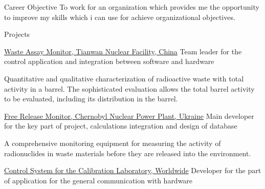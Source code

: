 \documentclass{cv} %
\begin{document}
\begin{rSection}{Career Objective}
 To work for an organization which provides me the opportunity to improve my skills which i can use for achieve organizational objectives.
\end{rSection}
\begin{rSection}{Projects}
\begin{rSubsection}
{\href{https://www.vfnuclear.com/en/products/waste-assay-monitor}{Waste Assay Monitor, Tianwan Nuclear Facility, China}}{}
{Team leader for the control application and integration between software and hardware}{}

Quantitative and qualitative characterization of radioactive waste with total activity in a barrel. The sophisticated evaluation allows the total barrel activity to be evaluated, including its distribution in the barrel.
\end{rSubsection}

\begin{rSubsection}
{\href{https://www.vfnuclear.com/en/free-release-monitor-frm-03-delivery-for-chernobyl-npp}{Free Release Monitor, Chernobyl Nuclear Power Plant, Ukraine}}{}
{Main developer for the key part of project, calculations integration and design of database}{}

A comprehensive monitoring equipment for measuring the activity of radionuclides in waste materials before they are released into the environment.
\end{rSubsection}



\begin{rSubsection}
{\href{https://www.vf.cz/en/products/dars-control-system-for-the-calibration-laboratory-dars}{Control System for the Calibration Laboratory, Worldwide}}{}
{Developer for the part of application for the general communication with hardware}{}


\end{rSubsection}
\end{rSection}
\end{document}
